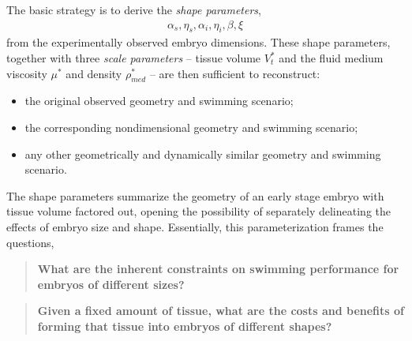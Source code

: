 \documentclass[10pt,a4paper]{article}
\def\Vts{V_t^*}
\begin{document}
The basic strategy is to derive the \textit{shape parameters}, 
\begin{eqnarray}\label{shapars}
	\alpha_s, \eta_s, \alpha_{i}, \eta_{i}, \beta, \xi
\end{eqnarray}
from the experimentally observed embryo dimensions.
These shape parameters, together with three \textit{scale parameters} -- tissue volume $\Vts$ and the fluid medium viscosity $\mu^*$ and density $\rho_{med}^*$ -- are then sufficient to reconstruct:
\begin{itemize}
	\item the original observed geometry and swimming scenario;
	\item the corresponding nondimensional geometry and swimming scenario;
	\item any other geometrically and dynamically similar geometry and swimming scenario.
\end{itemize}
The shape parameters summarize the geometry of an early stage embryo with tissue volume factored out, opening the possibility of separately delineating the effects of embryo size and shape.
Essentially, this parameterization frames the questions,
\begin{quotation}
	\textbf{What are the inherent constraints on swimming performance for embryos of different sizes?}
\end{quotation}
\begin{quotation}
	\textbf{Given a fixed amount of tissue, what are the costs and benefits of forming that tissue into embryos of different shapes?}
\end{quotation}
\end{document}
